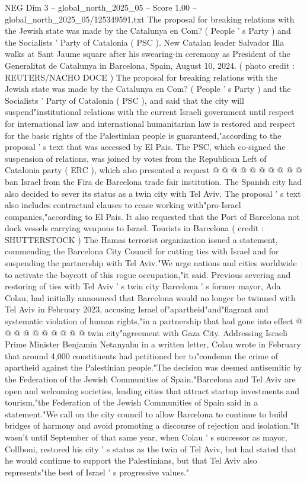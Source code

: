 \begin{textsample}{NEG Dim 3 – global\_north\_2025\_05 – Score 1.00 – global\_north\_2025\_05/125349591.txt}  \label{ex:f3_neg_322}
The proposal for breaking relations with the Jewish state was made by the Catalunya en Com? ( People ' s Party ) and the Socialists ' Party of Catalonia ( PSC ).
New Catalan leader Salvador Illa walks at Sant Jaume square after his swearing-in ceremony as President of the Generalitat de Catalunya in Barcelona, Spain, August 10, 2024. ( photo credit : REUTERS/NACHO DOCE ) The proposal for breaking relations with the Jewish state was made by the Catalunya en Com? ( People ' s Party ) and the Socialists ' Party of Catalonia ( PSC ), and said that the city will suspend"institutional relations with the current Israeli government until respect for international law and international humanitarian law is restored and respect for the basic rights of the Palestinian people is guaranteed,"according to the proposal ' s text that was accessed by El Pais.
The PSC, which co-signed the suspension of relations, was joined by votes from the Republican Left of Catalonia party ( ERC ), which also presented a request @ @ @ @ @ @ @ @ @ @ ban Israel from the Fira de Barcelona trade fair institution.
The Spanish city had also decided to sever its status as a twin city with Tel Aviv.
The proposal ' s text also includes contractual clauses to cease working with"pro-Israel companies,"according to El Pais.
It also requested that the Port of Barcelona not dock vessels carrying weapons to Israel.
Tourists in Barcelona ( credit : SHUTTERSTOCK ) The Hamas terrorist organization issued a statement, commending the Barcelona City Council for cutting ties with Israel and for suspending the partnership with Tel Aviv."We urge nations and cities worldwide to activate the boycott of this rogue occupation,"it said.
Previous severing and restoring of ties with Tel Aviv ' s twin city Barcelona ' s former mayor, Ada Colau, had initially announced that Barcelona would no longer be twinned with Tel Aviv in February 2023, accusing Israel of"apartheid"and"flagrant and systematic violation of human rights,"in a partnership that had gone into effect @ @ @ @ @ @ @ @ @ @ twin city"agreement with Gaza City.
Addressing Israeli Prime Minister Benjamin Netanyahu in a written letter, Colau wrote in February that around 4,000 constituents had petitioned her to"condemn the crime of apartheid against the Palestinian people."The decision was deemed antisemitic by the Federation of the Jewish Communities of Spain."Barcelona and Tel Aviv are open and welcoming societies, leading cities that attract startup investments and tourism,"the Federation of the Jewish Communities of Spain said in a statement."We call on the city council to allow Barcelona to continue to build bridges of harmony and avoid promoting a discourse of rejection and isolation."It wasn't until September of that same year, when Colau ' s successor as mayor, Collboni, restored his city ' s status as the twin of Tel Aviv, but had stated that he would continue to support the Palestinians, but that Tel Aviv also represents"the best of Israel ' s progressive values."

\end{textsample}
